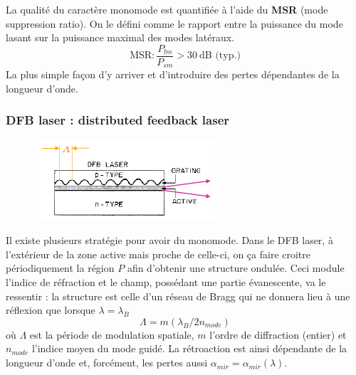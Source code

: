 La qualité du caractère monomode est quantifiée à l'aide du \textbf{MSR} (mode suppression ratio). On
le défini comme le rapport entre la puissance du mode lasant sur la puissance maximal des modes 
latéraux.
\begin{equation}
\text{MSR} : \dfrac{P_{lm}}{P_{sm}} > 30\ \text{dB (typ.)}
\end{equation}
La plus simple façon d'y arriver et d'introduire des pertes dépendantes de la longueur d'onde.



\subsubsection{DFB laser : distributed feedback laser}
	\begin{figure}
	\vspace{-5mm}
	\includegraphics[scale=0.6]{ch4/image17}
	\end{figure}
Il existe plusieurs stratégie pour avoir du monomode. Dans le DFB laser, à l'extérieur de la zone
active mais proche de celle-ci, on ça faire croitre périodiquement la région $P$ afin d'obtenir une
structure ondulée. Ceci module l'indice de réfraction et le champ, possédant une partie évanescente, 
va le ressentir : la structure est celle d'un réseau de Bragg qui ne donnera lieu à une réflexion 
que lorsque $\lambda=\lambda_B$
\begin{equation}
\Lambda = m(\lambda_B/2n_{mode})
\end{equation}
où $\Lambda$ est la période de modulation spatiale, $m$ l'ordre de diffraction (entier) et 
$n_{mode}$ l'indice moyen du mode guidé. La rétroaction est ainsi dépendante de la longueur d'onde
et, forcément, les pertes aussi $\alpha_{mir} = \alpha_{mir}(\lambda)$.\\

